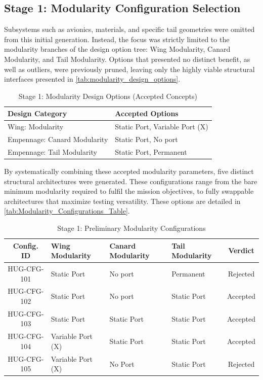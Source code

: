 \subsection{Stage 1: Modularity Configuration Selection}
Subsystems such as avionics, materials, and specific tail geometries were omitted from this initial generation. Instead, the focus was strictly limited to the modularity branches of the design option tree: Wing Modularity, Canard Modularity, and Tail Modularity. Options that presented no distinct benefit, as well as outliers, were previously pruned, leaving only the highly viable structural interfaces presented in \autoref{tab:modularity_design_options}.

\begin{table}[H]
    \centering
    \caption{Stage 1: Modularity Design Options (Accepted Concepts)}
    \label{tab:modularity_design_options}
    \renewcommand{\arraystretch}{1.2}
    \begin{tabular}{|l|p{10cm}|}
        \hline
        \textbf{Design Category} & \textbf{Accepted Options} \\ \hline \hline
        Wing: Modularity & Static Port, Variable Port (X) \\ \hline
        Empennage: Canard Modularity & Static Port, No port \\ \hline
        Empennage: Tail Modularity & Static Port, Permanent \\ \hline
    \end{tabular}
\end{table}

By systematically combining these accepted modularity parameters, five distinct structural architectures were generated. These configurations range from the bare minimum modularity required to fulfil the mission objectives, to fully swappable architectures that maximize testing versatility. These options are detailed in \autoref{tab:Modularity_Configurations_Table}.

\begin{table}[H]
    \centering
    \caption{Stage 1: Preliminary Modularity Configurations}
    \label{tab:Modularity_Configurations_Table}
    \renewcommand{\arraystretch}{1.3}
    \begin{tabular}{|c|p{3.2cm}|p{3.2cm}|p{3.2cm}|c|}
        \hline
        \textbf{Config. ID} & \textbf{Wing Modularity} & \textbf{Canard Modularity} & \textbf{Tail Modularity} & \textbf{Verdict} \\
        \hline\hline
        HUG-CFG-101 & Static Port & No port & Permanent & Rejected \\
        \hline
        HUG-CFG-102 & Static Port & No port & Static Port & Accepted \\
        \hline
        HUG-CFG-103 & Static Port & Static Port & Static Port & Accepted \\
        \hline
        HUG-CFG-104 & Variable Port (X) & Static Port & Static Port & Accepted \\
        \hline
        HUG-CFG-105 & Variable Port (X) & No Port & Static Port & Rejected \\
        \hline
    \end{tabular}
\end{table}

